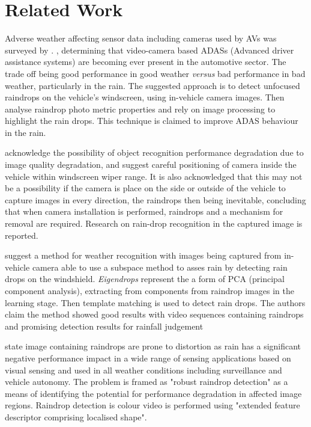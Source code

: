 

\section{Related Work}

Adverse weather affecting sensor data including cameras used by AVs was surveyed by \cite{ZangAdverseWetherAVSurvey8666747}.  
\cite{ClearingSkiesDeepNNRainRemoval7893758}
\cite{Cord2014DetectingUR}, determining that video-camera based ADASs (Advanced driver assistance systems) are becoming ever present in the automotive sector. The trade off being good performance in good weather \textit{versus} bad performance in bad weather, particularly in the rain. The suggested approach is to detect unfocused raindrops on the vehicle's windscreen, using in-vehicle camera images. Then analyse raindrop photo metric properties and rely on image processing to highlight the rain drops. This technique is claimed to improve ADAS behaviour in the rain.  
  
\cite{yoneda2019automated} acknowledge the possibility of object recognition performance degradation due to image quality degradation, and suggest careful positioning of camera inside the vehicle within windscreen wiper range. It is also acknowledged that this may not be a possibility if the camera is place on the side or outside of the vehicle to capture images in every direction, the raindrops then being inevitable, concluding that when camera installation is performed, raindrops and a mechanism for removal are required. Research on rain-drop recognition in the captured image is reported.

\cite{kurihata2005rainy} suggest a method for weather recognition with images being captured from in-vehicle camera able to use a subspace method to asses rain by detecting rain drops on the windshield.
\textit{Eigendrops} represent the a form of PCA (principal component analysis), extracting from components from raindrop images in the learning stage. Then template matching is used to detect rain drops. The authors claim the method showed good results with video sequences containing raindrops and promising detection results for rainfall judgement 
  
\cite{webster2015improved} state image containing raindrops are prone to distortion as rain has a significant negative performance impact in a wide range of sensing applications based on visual sensing and used in all weather conditions including surveillance and vehicle autonomy. The problem is framed as "robust raindrop detection" as a means of identifying the potential for performance degradation in affected image regions. Raindrop detection is colour video is performed using "extended feature descriptor comprising localised shape".
  
